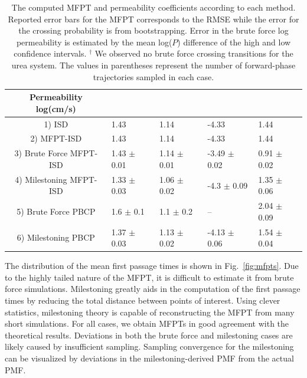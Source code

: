 \begin{table}[htbp]
\begin{sideways}
\begin{tabular}{|c|p{2.25cm}|p{2.25cm}|p{2.25cm}|p{2.25cm}|}
    \textbf{Permeability log(cm/s)} & & & & \\\hline
    1) ISD                  & 1.43            & 1.14             & -4.33            & 1.44           \\\hline
    2) MFPT-ISD             & 1.43            & 1.14             & -4.33            & 1.44           \\\hline
    3) Brute Force MFPT-ISD & 1.43 $\pm$ 0.01 & 1.14 $\pm$ 0.01  & -3.49 $\pm$ 0.02 & 0.91 $\pm$ 0.02\\\hline
    4) Milestoning MFPT-ISD & 1.33 $\pm$ 0.03 & 1.06 $\pm$ 0.02  & -4.3 $\pm$ 0.09  & 1.35 $\pm$ 0.06\\\hline
    5) Brute Force PBCP     & 1.6 $\pm$ 0.1   & 1.1 $\pm$ 0.2    & --               & 2.04 $\pm$ 0.09\\\hline
    6) Milestoning PBCP     & 1.37 $\pm$ 0.03 & 1.13 $\pm$ 0.02  & -4.13 $\pm$ 0.06 & 1.54 $\pm$ 0.04\\\hline
    \end{tabular}
\end{sideways}
\caption{The computed MFPT and permeability coefficients according to each method. Reported error bars for the MFPT corresponds to the RMSE while the error for the crossing probability is from bootstrapping. Error in the brute force log permeability is estimated by the mean log($P$) difference of the high and low confidence intervals. $^{\dagger}$ We observed no brute force crossing transitions for the urea system. The values in parentheses represent the number of forward-phase trajectories sampled in each case.}
\label{table:results}
\end{table}

    \par The distribution of the mean first passage times is shown in Fig.~\ref{fig:mfpts}. Due to the highly tailed nature of the MFPT, it is difficult to estimate it from brute force simulations. Milestoning greatly aids in the computation of the first passage times by reducing the total distance between points of interest. Using clever statistics, milestoning theory is capable of reconstructing the MFPT from many short simulations. For all cases, we obtain MFPTs in good agreement with the theoretical results. Deviations in both the brute force and milestoning cases are likely caused by insufficient sampling. Sampling convergence for the milestoning can be visualized by deviations in the milestoning-derived PMF from the actual PMF.

